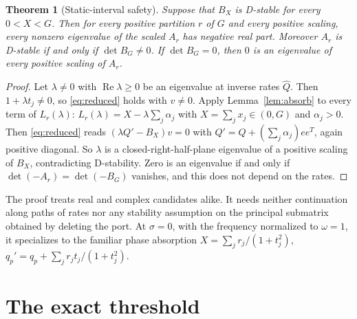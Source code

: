\documentclass[11pt,a4paper]{article}
\theoremstyle{plain}
\newtheorem{theorem}{Theorem}[section]
\theoremstyle{definition}
\theoremstyle{remark}
\newcommand{\Real}{\operatorname{Re}}
\begin{document}
\begin{theorem}[Static-interval safety]\label{thm:safety}
Suppose that $B_X$ is D-stable for every $0<X<G$. Then for every positive
partition $r$ of $G$ and every positive scaling, every nonzero eigenvalue of
the scaled $A_r$ has negative real part. Moreover $A_r$ is D-stable if and only
if $\det B_G\ne0$. If $\det B_G=0$, then $0$ is an eigenvalue of every positive
scaling of $A_r$.
\end{theorem}
\begin{proof}
Let $\lambda\ne0$ with $\Real\lambda\ge0$ be an eigenvalue at inverse rates
$\hat Q$. Then $1+\lambda t_j\ne0$, so \eqref{eq:reduced} holds with $v\ne0$.
Apply Lemma~\ref{lem:absorb} to every term of $L_r(\lambda)$:
$L_r(\lambda)=X-\lambda\sum_j\alpha_j$ with $X=\sum_jx_j\in(0,G)$ and
$\alpha_j>0$. Then \eqref{eq:reduced} reads
$(\lambda Q'-B_X)v=0$ with $Q'=Q+(\sum_j\alpha_j)ee^{T}$, again positive
diagonal. So $\lambda$ is a closed-right-half-plane eigenvalue of a positive
scaling of $B_X$, contradicting D-stability. Zero is an eigenvalue if and only
if $\det(-A_r)=\det(-B_G)$ vanishes, and this does not depend on the rates.
\end{proof}

The proof treats real and complex candidates alike. It needs neither
continuation along paths of rates nor any stability assumption on the
principal submatrix obtained by deleting the port. At $\sigma=0$, with the frequency normalized to $\omega=1$, it
specializes to the familiar phase absorption
$X=\sum_jr_j/(1+t_j^2)$, $q_p'=q_p+\sum_jr_jt_j/(1+t_j^2)$.

\section{The exact threshold}\label{sec:threshold}
\end{document}
